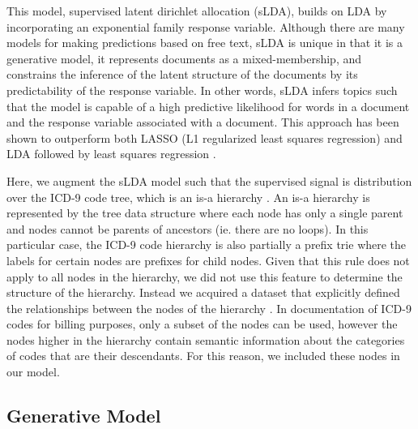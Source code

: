 \documentclass{article}
\begin{document}
This model, supervised latent dirichlet allocation (sLDA), builds on LDA by incorporating an exponential family response variable. Although there are many models for making predictions based on free text, sLDA is unique in that it is a generative model, it represents documents as a mixed-membership, and constrains the inference of the latent structure of the documents by its predictability of the response variable.  In other words, sLDA infers topics such that the model is capable of a high predictive likelihood for words in a document and the response variable associated with a document.  This approach has been shown to outperform both LASSO (L1 regularized least squares regression) and LDA followed by least squares regression \citep{BleiMcAuliffe2008}.

Here, we augment the sLDA model such that the supervised signal is distribution over the ICD-9 code tree, which is an is-a hierarchy \citep{ICD9NCBO}. An is-a hierarchy is represented by the tree data structure where each node has only a single parent and nodes cannot be parents of ancestors (ie. there are no loops). In this particular case, the ICD-9 code hierarchy is also partially a prefix trie where the labels for certain nodes are prefixes for child nodes. Given that this rule does not apply to all nodes in the hierarchy, we did not use this feature to determine the structure of the hierarchy.  Instead we acquired a dataset that explicitly defined the relationships between the nodes of the hierarchy \citep{ICD9NCBO}. In documentation of ICD-9 codes for billing purposes, only a subset of the nodes can be used, however the nodes higher in the hierarchy contain semantic information about the categories of codes that are their descendants. For this reason, we included these nodes in our model.

\subsection{Generative Model}
\end{document}
